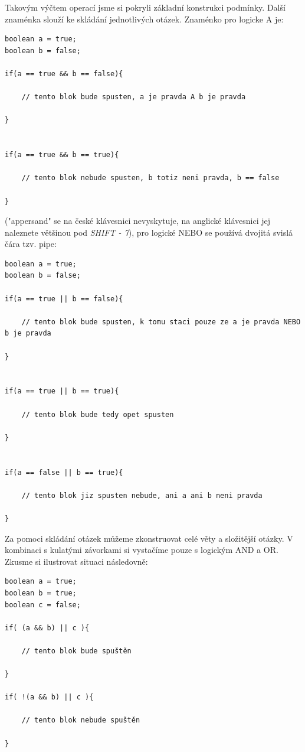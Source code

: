 \documentclass[11pt]{book}
\newcommand{\klavesy}[1]{\textsc{\em #1}}
\begin{document}
Takovým výčtem operací jsme si pokryli základní konstrukci podmínky. Další znaménka slouží ke skládání jednotlivých otázek. Znaménko pro logicke A je:

\begin{lstlisting}
boolean a = true;
boolean b = false;

if(a == true && b == false){

	// tento blok bude spusten, a je pravda A b je pravda

}


if(a == true && b == true){

	// tento blok nebude spusten, b totiz neni pravda, b == false

}

\end{lstlisting}


("appersand" se na české klávesnici nevyskytuje, na anglické klávesnici jej naleznete většinou pod \klavesy {SHIFT - 7}), pro logické NEBO se používá dvojitá svislá čára tzv. pipe:

\begin{lstlisting}
boolean a = true;
boolean b = false;

if(a == true || b == false){

	// tento blok bude spusten, k tomu staci pouze ze a je pravda NEBO b je pravda

}


if(a == true || b == true){

	// tento blok bude tedy opet spusten

}


if(a == false || b == true){

	// tento blok jiz spusten nebude, ani a ani b neni pravda 

}

\end{lstlisting}

Za pomoci skládání otázek můžeme zkonstruovat celé věty a složitější otázky. V kombinaci s kulatými závorkami si vystačíme pouze s logickým AND a OR. Zkusme si ilustrovat situaci následovně:


\begin{lstlisting}
boolean a = true;
boolean b = true;
boolean c = false;

if( (a && b) || c ){

	// tento blok bude spuštěn
	
}

if( !(a && b) || c ){

	// tento blok nebude spuštěn
	
}

\end{lstlisting}
\end{document}
